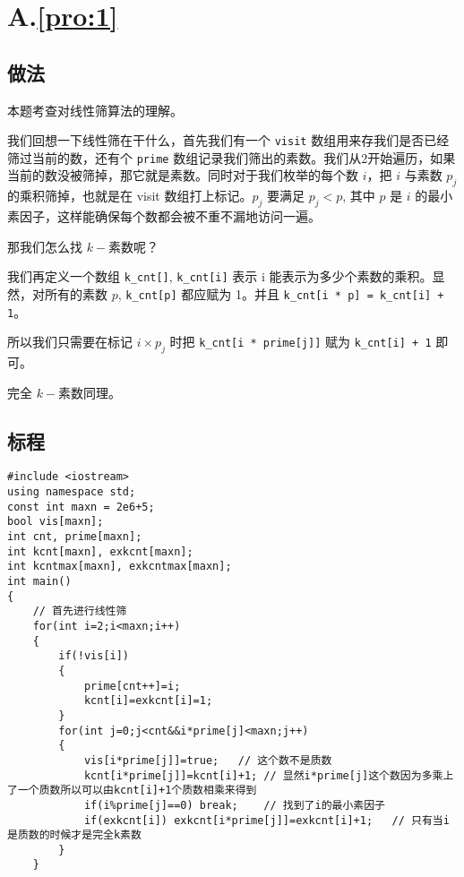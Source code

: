 \documentclass[
	lang=cn,
	color=blue
]{elegantbook}
\begin{document}
\chapter*{A.\quad \ref*{pro:1}}
\section*{做法}

本题考查对线性筛算法的理解。

我们回想一下线性筛在干什么，首先我们有一个 \verb|visit| 数组用来存我们是否已经筛过当前的数，还有个 \verb|prime| 数组记录我们筛出的素数。我们从2开始遍历，如果当前的数没被筛掉，那它就是素数。同时对于我们枚举的每个数 $i$，把 $i$ 与素数 $p_j$ 的乘积筛掉，也就是在 visit 数组打上标记。$p_j$ 要满足 $p_j<p$, 其中 $p$ 是 $i$ 的最小素因子，这样能确保每个数都会被不重不漏地访问一遍。

那我们怎么找 $k-$素数呢？

我们再定义一个数组 \verb|k_cnt[]|, \verb|k_cnt[i]| 表示 i 能表示为多少个素数的乘积。显然，对所有的素数 $p$, \verb|k_cnt[p]| 都应赋为 1。并且 \verb|k_cnt[i * p] = k_cnt[i] + 1|。

所以我们只需要在标记 $i\times p_j$ 时把 \verb|k_cnt[i * prime[j]]| 赋为 \verb|k_cnt[i] + 1| 即可。

完全 $k-$素数同理。

\section*{标程}
\begin{lstlisting}
#include <iostream>
using namespace std;
const int maxn = 2e6+5;
bool vis[maxn];
int cnt, prime[maxn];
int kcnt[maxn], exkcnt[maxn];
int kcntmax[maxn], exkcntmax[maxn];
int main()
{
    // 首先进行线性筛
    for(int i=2;i<maxn;i++)
    {
        if(!vis[i])
        {
            prime[cnt++]=i;
            kcnt[i]=exkcnt[i]=1;
        }
        for(int j=0;j<cnt&&i*prime[j]<maxn;j++)
        {
            vis[i*prime[j]]=true;   // 这个数不是质数
            kcnt[i*prime[j]]=kcnt[i]+1; // 显然i*prime[j]这个数因为多乘上了一个质数所以可以由kcnt[i]+1个质数相乘来得到
            if(i%prime[j]==0) break;    // 找到了i的最小素因子
            if(exkcnt[i]) exkcnt[i*prime[j]]=exkcnt[i]+1;   // 只有当i是质数的时候才是完全k素数
        }
    }
\end{lstlisting}
\newpage
\end{document}
